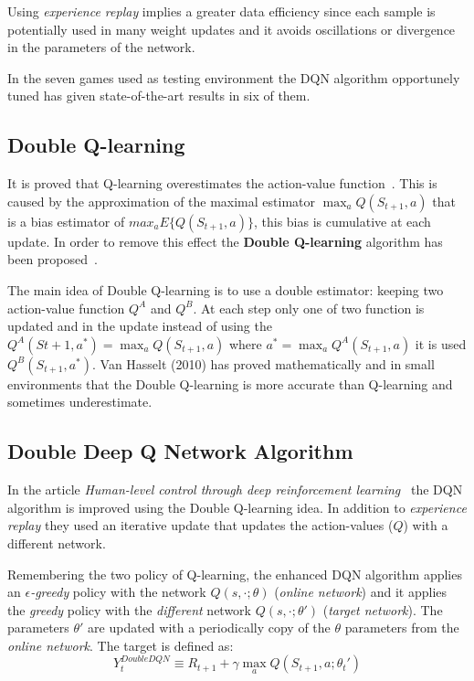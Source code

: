 Using \textit{experience replay} implies a greater data efficiency since each sample is potentially used in many weight updates and it avoids oscillations or divergence in the parameters of the network.

In the seven games used as testing environment the DQN algorithm opportunely tuned has given state-of-the-art results in six of them.




\subsection{Double Q-learning}
\label{subsec:DoubleQlearning}

It is proved that Q-learning overestimates the action-value function~\cite{NIPS2010_3964}. This is caused by the approximation of the maximal estimator $\max_a Q(S_{t+1}, a)$ that is a bias estimator of $max_a E \{ Q(S_{t+1}, a) \}$, this bias is cumulative at each update. In order to remove this effect the \textbf{Double Q-learning} algorithm has been proposed~\cite{NIPS2010_3964}.

The main idea of Double Q-learning is to use a double estimator: keeping two action-value function $Q^A$ and $Q^B$. At each step only one of two function is updated and in the update instead of using the $Q^A(S{t+1}, a^*) = \max_a Q(S_{t+1}, a)$ where $a^* = \max_a Q^A(S_{t+1}, a)$ it is used $Q^B(S_{t+1}, a^*)$.
Van Hasselt (2010) has proved mathematically and in small environments that the Double Q-learning is more accurate than Q-learning and sometimes underestimate.

\subsection{Double Deep Q Network Algorithm}

In the article \textit{Human-level control through deep reinforcement learning}~\cite{Mnih2015} the DQN algorithm is improved using the Double Q-learning idea. In addition to \textit{experience replay} they used an iterative update that updates the action-values ($Q$) with a different network. 

Remembering the two policy of Q-learning, the enhanced DQN algorithm applies an \textit{$\epsilon$-greedy} policy with the network $Q(s, \cdotp; \theta)$ (\textit{online network}) and it applies the \textit{greedy} policy with the \emph{different} network $Q(s, \cdotp; \theta')$ (\textit{target network}). The parameters $\theta'$ are updated with a periodically copy of the $\theta$ parameters from the \textit{online network}. The target is defined as:
\begin{equation}
	Y^{DoubleDQN}_t \equiv R_{t+1} + \gamma \max_{a} Q(S_{t+1}, a; \theta_t')
\end{equation}

